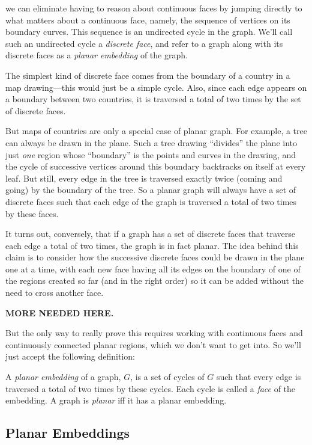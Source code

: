 we can eliminate having to reason about continuous faces by jumping
directly to what matters about a continuous face, namely, the sequence of
vertices on its boundary curves.  This sequence is an undirected cycle in
the graph.  We'll call such an undirected cycle a \emph{discrete face},
and refer to a graph along with its discrete faces as a \emph{planar
embedding} of the graph.

The simplest kind of discrete face comes from the boundary of a
country in a map drawing---this would just be a simple cycle.  Also,
since each edge appears on a boundary between two countries, it is
traversed a total of two times by the set of discrete faces.

But maps of countries are only a special case of planar graph.  For
example, a tree can always be drawn in the plane.  Such a tree drawing
``divides'' the plane into just \emph{one} region whose ``boundary'' is
the points and curves in the drawing, and the cycle of successive vertices
around this boundary backtracks on itself at every leaf.  But still, every
edge in the tree is traversed exactly twice (coming and going) by the
boundary of the tree.  So a planar graph will always have a set of
discrete faces such that each edge of the graph is traversed a total of
two times by these faces.

It turns out, conversely, that if a graph has a set of discrete faces that
traverse each edge a total of two times, the graph is in fact planar.  The
idea behind this claim is to consider how the successive discrete faces
could be drawn in the plane one at a time, with each new face having all
its edges on the boundary of one of the regions created so far (and in the
right order) so it can be added without the need to cross another face.

\textbf{MORE NEEDED HERE.}

But the only way to really prove this requires working with continuous
faces and continuously connected planar regions, which we don't want to
get into.  So we'll just accept the following definition:

\begin{definition}
A \emph{planar embedding} of a graph, $G$, is a set of cycles of $G$ such
that every edge is traversed a total of two times by these cycles.  Each
cycle is called a \emph{face} of the embedding.  A graph is \emph{planar}
iff it has a planar embedding.
\end{definition}
\fi

\subsection{Planar Embeddings}

